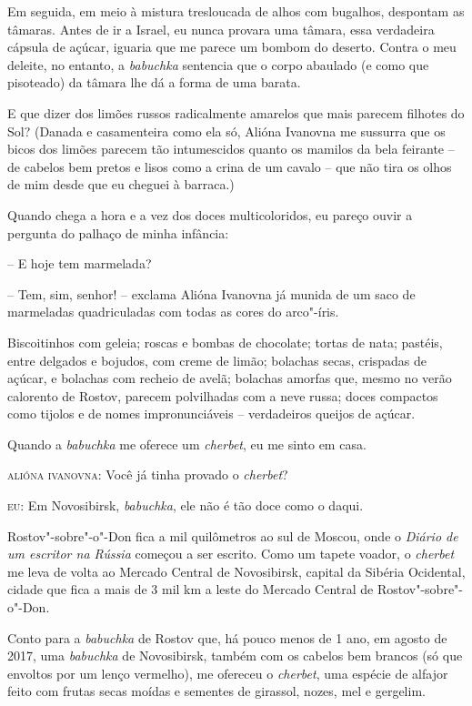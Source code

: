 Em seguida, em meio à mistura tresloucada de alhos com bugalhos,
despontam as tâmaras. Antes de ir a Israel, eu nunca provara uma tâmara,
essa verdadeira cápsula de açúcar, iguaria que me parece um bombom do
deserto. Contra o meu deleite, no entanto, a \emph{babuchka} sentencia
que o corpo abaulado (e como que pisoteado) da tâmara lhe dá a forma de
uma barata.

E que dizer dos limões russos radicalmente amarelos que mais parecem
filhotes do Sol? (Danada e casamenteira como ela só, Alióna Ivanovna me
sussurra que os bicos dos limões parecem tão intumescidos quanto os
mamilos da bela feirante -- de cabelos bem pretos e lisos como a crina
de um cavalo -- que não tira os olhos de mim desde que eu cheguei à
barraca.)

Quando chega a hora e a vez dos doces multicoloridos, eu pareço ouvir a
pergunta do palhaço de minha infância:

-- E hoje tem marmelada?

-- Tem, sim, senhor! -- exclama Alióna Ivanovna já munida de um saco de
marmeladas quadriculadas com todas as cores do arco"-íris.

Biscoitinhos com geleia; roscas e bombas de chocolate; tortas de nata;
pastéis, entre delgados e bojudos, com creme de limão; bolachas secas,
crispadas de açúcar, e bolachas com recheio de avelã; bolachas amorfas
que, mesmo no verão calorento de Rostov, parecem polvilhadas com a neve
russa; doces compactos como tijolos e de nomes impronunciáveis --
verdadeiros queijos de açúcar.

Quando a \emph{babuchka} me oferece um \emph{cherbet}, eu me sinto em
casa.

\textsc{alióna ivanovna:} Você já tinha provado o \emph{cherbet}?

\textsc{eu:} Em Novosibirsk, \emph{babuchka}, ele não é tão doce como o
daqui.

Rostov"-sobre"-o"-Don fica a mil quilômetros ao sul de Moscou, onde o
\emph{Diário de um escritor na Rússia} começou a ser escrito. Como um
tapete voador, o \emph{cherbet} me leva de volta ao Mercado Central de
Novosibirsk, capital da Sibéria Ocidental, cidade que fica a mais de 3
mil km a leste do Mercado Central de Rostov"-sobre"-o"-Don.

Conto para a \emph{babuchka} de Rostov que, há pouco menos de 1 ano, em
agosto de 2017, uma \emph{babuchka} de Novosibirsk, também com os
cabelos bem brancos (só que envoltos por um lenço vermelho), me ofereceu
o \emph{cherbet}, uma espécie de alfajor feito com frutas secas moídas e
sementes de girassol, nozes, mel e gergelim.

